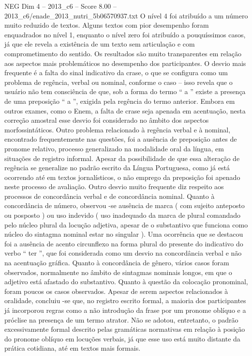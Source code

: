 \begin{textsample}{NEG Dim 4 – 2013\_c6 – Score 8.00 – 2013\_c6/enade\_2013\_nutri\_5b06570937.txt}
O nível 4 foi atribuído a um número muito reduzido de textos.
Alguns textos com pior desempenho foram enquadrados no nível 1, enquanto o nível zero foi atribuído a pouquíssimos casos, já que ele revela a existência de um texto sem articulação e com comprometimento do sentido.
Os resultados são muito transparentes em relação aos aspectos mais problemáticos no desempenho dos participantes.
O desvio mais frequente é a falta do sinal indicativo da crase, o que se configura como um problema de regência, verbal ou nominal, conforme o caso – isso revela que o usuário não tem consciência de que, sob a forma do termo “ a ” existe a presença de uma preposição “ a ”, exigida pela regência do termo anterior.
Embora em outros exames, como o Enem, a falta de crase seja apenada em acentuação, nesta correção amostral esse desvio foi considerado no âmbito dos aspectos morfossintáticos.
Outro problema relacionado à regência verbal e à nominal, encontrado frequentemente nas questões, foi a ausência de preposição antes de pronome relativo, processo generalizado na modalidade oral da língua, em situações de registro informal.
Apesar da possibilidade de que essa alteração de regência se generalize no padrão escrito da Língua Portuguesa, como já está ocorrendo até em textos jornalísticos, o não emprego da preposição foi apenado neste processo de avaliação.
Outro desvio muito frequente diz respeito aos processos de concordância verbal e de concordância nominal.
Quanto à concordância de número, observou -se ausência de marca ( com sujeito anteposto ou posposto ) ou uso indevido ( uso inadequado da marca de plural comandado pelo núcleo plural da locução adjetiva, apesar de o substantivo que funciona como núcleo do sintagma nominal estar no singular ).
Uma ocorrência que se destacou foi a ausência de acento circunflexo na forma plural do presente do indicativo do verbo “ ter ”, que foi considerada como um desvio na concordância verbal e não na acentuação gráfica.
Quanto à concordância de gênero, vários casos foram observados, normalmente no âmbito de sintagmas nominais longos, em que o adjetivo está afastado do substantivo.
Quanto à questão da colocação pronominal, foram poucos os casos observados.
Apesar de serem aspectos relacionados à oralidade, concluiu -se que, no registro escrito formal, a maioria dos participantes já incorporou regras como a não introdução da frase por um pronome oblíquo e a próclise na presença de um termo atrator.
Não se adotou, entretanto, o padrão excessivamente formal descrito pelas gramáticas normativas em relação à posição do pronome oblíquo em locuções verbais, já que esse uso está muito distante da prática cotidiana, até em textos mais formais.

\end{textsample}
